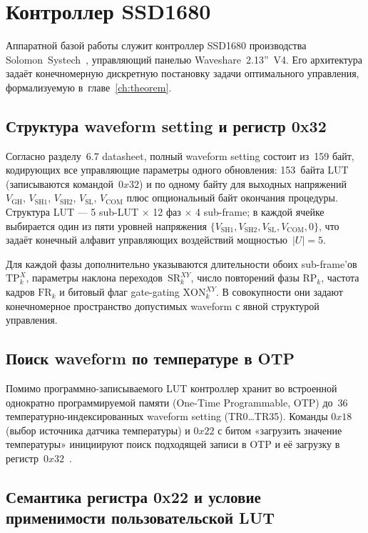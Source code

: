\section{Контроллер SSD1680}\label{sec:ssd1680}

Аппаратной базой работы служит контроллер SSD1680 производства
Solomon~Systech~\cite{ssd1680_datasheet}, управляющий панелью
Waveshare~2.13''~V4. Его архитектура задаёт конечномерную дискретную постановку
задачи оптимального управления, формализуемую в~главе~\ref{ch:theorem}.

\subsection*{Структура waveform setting и регистр 0x32}

Согласно разделу~6.7 datasheet, полный waveform setting состоит из~159 байт,
кодирующих все управляющие параметры одного обновления: 153~байта LUT
(записываются командой~$0x32$) и по одному байту для выходных напряжений
$V_{\text{GH}}$, $V_{\text{SH1}}$, $V_{\text{SH2}}$, $V_{\text{SL}}$,
$V_{\text{COM}}$ плюс опциональный байт окончания процедуры. Структура LUT ---
5 sub-LUT $\times$ 12 фаз $\times$ 4 sub-frame; в каждой ячейке выбирается один
из пяти уровней напряжения
$\{V_{\text{SH1}}, V_{\text{SH2}}, V_{\text{SL}}, V_{\text{COM}}, 0\}$, что
задаёт конечный алфавит управляющих воздействий мощностью~$|U| = 5$.

Для каждой фазы дополнительно указываются длительности обоих sub-frame'ов
$\mathrm{TP}_k^{X}$, параметры наклона переходов~$\mathrm{SR}_k^{XY}$, число
повторений фазы $\mathrm{RP}_k$, частота кадров $\mathrm{FR}_k$ и битовый флаг
gate-gating $\mathrm{XON}_k^{XY}$. В совокупности они задают конечномерное
пространство допустимых waveform с явной структурой управления.

\subsection*{Поиск waveform по температуре в OTP}

Помимо программно-записываемого LUT контроллер хранит во встроенной однократно
программируемой памяти (One-Time Programmable, OTP) до~36 температурно-индексированных
waveform setting (TR0\ldots TR35). Команды $0x18$ (выбор источника датчика
температуры) и $0x22$ с битом «загрузить значение температуры» инициируют поиск
подходящей записи в OTP и её загрузку в регистр~$0x32$~\cite{ssd1680_datasheet}.

\subsection*{Семантика регистра 0x22 и условие применимости пользовательской LUT}

